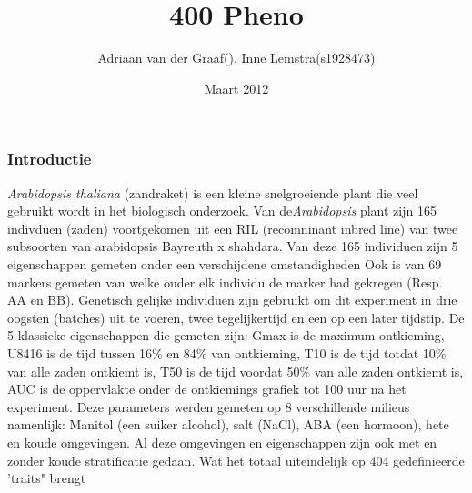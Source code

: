 \documentclass[12pt,a4paper]{article}
\author{Adriaan van der Graaf(), Inne Lemstra(s1928473)}
\title{400 Pheno}
\date{Maart 2012}
\begin{document}
\maketitle



\subsubsection*{Introductie}
\textit{Arabidopsis thaliana} (zandraket) is een kleine snelgroeiende plant die veel gebruikt wordt in het biologisch onderzoek.
Van de\textit{Arabidopsis} plant zijn 165 indivduen (zaden) voortgekomen uit een RIL (recomninant inbred line) van twee subsoorten van arabidopsis Bayreuth x shahdara.
Van deze 165 individuen zijn 5 eigenschappen gemeten onder een verschijdene omstandigheden
Ook is van 69 markers  gemeten van welke ouder elk individu de marker had gekregen (Resp. AA en BB).
Genetisch gelijke individuen zijn gebruikt om dit experiment in drie oogsten (batches) uit te voeren, twee tegelijkertijd en een op een later tijdstip.
De 5 klassieke eigenschappen die gemeten zijn:
Gmax is de maximum ontkieming,
U8416 is de tijd tussen 16\% en 84\% van  ontkieming,
T10 is de tijd totdat 10\% van alle zaden ontkiemt is,
T50 is de tijd voordat 50\% van alle zaden ontkiemt is,
AUC is de oppervlakte onder de ontkiemings grafiek  tot 100 uur na het experiment.
Deze parameters werden gemeten op 8 verschillende milieus namenlijk:
Manitol (een suiker alcohol), salt (NaCl), ABA (een hormoon), hete en koude omgevingen.
Al deze omgevingen en eigenschappen zijn ook met en zonder koude stratificatie gedaan. 
Wat het totaal uiteindelijk op 404 gedefinieerde 'traits" brengt\\
\end{document}

